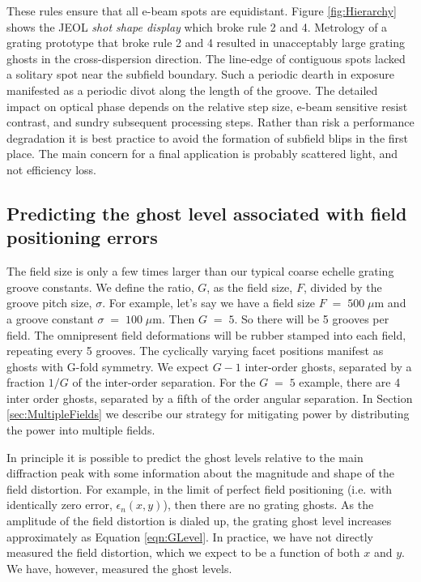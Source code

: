 \documentclass[]{spie}  %
\begin{document}
These rules ensure that all e-beam spots are equidistant.  Figure \ref{fig:Hierarchy}  shows the JEOL \emph{shot shape display} which broke rule 2 and 4.  Metrology of a grating prototype that broke rule 2 and 4 resulted in unacceptably large grating ghosts in the cross-dispersion direction.  The line-edge of contiguous spots lacked a solitary spot near the subfield boundary.  Such a periodic dearth in exposure manifested as a periodic divot along the length of the groove.  The detailed impact on optical phase depends on the relative step size, e-beam sensitive resist contrast, and sundry subsequent processing steps.  Rather than risk a performance degradation it is best practice to avoid the formation of subfield blips in the first place.  The main concern for a final application is probably scattered light, and not efficiency loss. 

\subsection{Predicting the ghost level associated with field positioning errors}
\label{sec:Ghosts}

The field size is only a few times larger than our typical coarse echelle grating groove constants.  We define the ratio, $G$, as the field size, $F$, divided by the groove pitch size, $\sigma$.  For example, let's say we have a field size $F\;=\;500\;\mu$m and a groove constant $\sigma \; =\; 100 \; \mu$m.  Then $G\;=\;5$.  So there will be 5 grooves per field.  The omnipresent field deformations will be rubber stamped into each field, repeating every 5 grooves.  The cyclically varying facet positions manifest as ghosts with G-fold symmetry. We expect $G-1$ inter-order ghosts, separated by a fraction $1/G$ of the inter-order separation.  For the $G\;=\;5$ example, there are 4 inter order ghosts, separated by a fifth of the order angular separation.  In Section \ref{sec:MultipleFields} we describe our strategy for mitigating power by distributing the power into multiple fields.

In principle it is possible to predict the ghost levels relative to the main diffraction peak with some information about the magnitude and shape of the field distortion.  For example, in the limit of perfect field positioning (i.e. with identically zero error, $\epsilon_n(x,y)$), then there are no grating ghosts.  As the amplitude of the field distortion is dialed up, the grating ghost level increases approximately as Equation \ref{eqn:GLevel}.  In practice, we have not directly measured the field distortion, which we expect to be a function of both $x $ and $y$.  We have, however, measured the ghost levels.  
\end{document}

